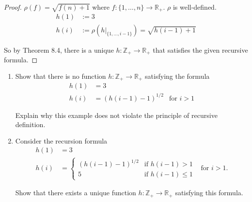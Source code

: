 \begin{proof}
    $\rho(f) = \sqrt{f(n) + 1}$ where $f: \{ 1, \ldots, n \}\to \mathbb{R}_{+}$. $\rho$ is well-defined.
    \begin{align*}
        h(1) & := 3                                                     \\
        h(i) & := \rho(h\vert_{\{1,\ldots,i-1\}}) = \sqrt{h(i - 1) + 1}
    \end{align*}

    So by Theorem 8.4, there is a unique $h: \mathbb{Z}_{+}\to \mathbb{R}_{+}$ that satisfies the given recursive formula.
\end{proof}

\begin{exercise}\label{chapter1:section8:exercise6}
    \begin{enumerate}[label={(\alph*)}]
        \item Show that there is no function $h: \mathbb{Z}_{+}\to\mathbb{R}_{+}$ satisfying the formula
              \begin{align*}
                  h(1) & = 3                                           \\
                  h(i) & = {(h(i - 1) - 1)}^{1/2} & \text{for $i > 1$}
              \end{align*}

              Explain why this example does not violate the principle of recursive definition.
        \item Consider the recursion formula
              \begin{align*}
                  h(1) & = 3                                                 \\
                  h(i) & = \begin{cases}
                               {(h(i-1) - 1)}^{1/2} & \text{if $h(i - 1) > 1$}   \\
                               5                    & \text{if $h(i - 1)\leq 1$}
                           \end{cases} & \text{for $i > 1$.}
              \end{align*}

              Show that there exists a unique function $h: \mathbb{Z}_{+}\to \mathbb{R}_{+}$ satisfying this formula.
    \end{enumerate}
\end{exercise}

